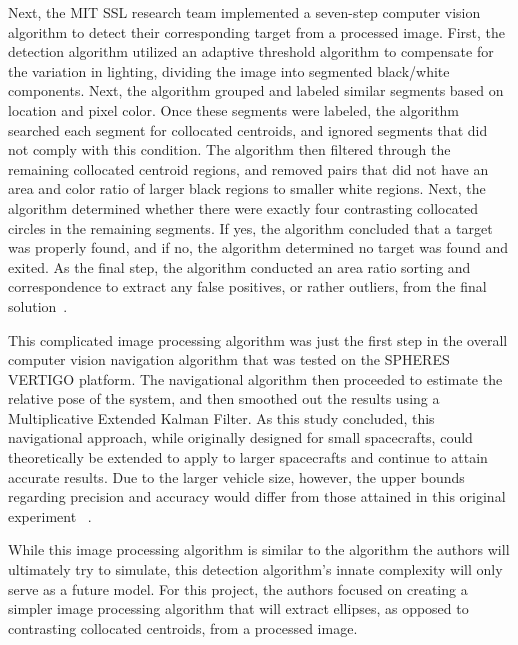 \documentclass[journal, 10pt]{IEEEtran}
\begin{document}
Next, the MIT SSL research team implemented a seven-step computer vision algorithm to detect their corresponding target from a processed image. First, the detection algorithm utilized an adaptive threshold algorithm to compensate for the variation in lighting, dividing the image into segmented black/white components. Next, the algorithm grouped and labeled similar segments based on location and pixel color. Once these segments were labeled, the algorithm searched each segment for collocated centroids, and ignored segments that did not comply with this condition. The algorithm then filtered through the remaining collocated centroid regions, and removed pairs that did not have an area and color ratio of larger black regions to smaller white regions.  Next, the algorithm determined whether there were exactly four contrasting collocated circles in the remaining segments. If yes, the algorithm concluded that a target was properly found, and if no, the algorithm determined no target was found and exited. As the final step, the algorithm conducted an area ratio sorting and correspondence to extract any false positives, or rather outliers, from the final solution~\cite{Vision, Thesis}.

This complicated image processing algorithm was just the first step in the overall computer vision navigation algorithm that was tested on the SPHERES VERTIGO platform. The navigational algorithm then proceeded to estimate the relative pose of the system, and then smoothed out the results using a Multiplicative Extended Kalman Filter. As this study concluded, this navigational approach, while originally designed for small spacecrafts, could theoretically be extended to apply to larger spacecrafts and continue to attain accurate results. Due to the larger vehicle size, however, the upper bounds regarding precision and accuracy would differ from those attained in this original experiment ~\cite{Vision, Thesis}.

While this image processing algorithm is similar to the algorithm the authors will ultimately try to simulate, this detection algorithm's innate complexity will only serve as a future model. For this project, the authors focused on creating a simpler image processing algorithm that will extract ellipses, as opposed to contrasting collocated centroids, from a processed image.
\end{document}
